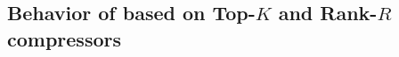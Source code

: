 \documentclass[11pt]{article}
\begin{document}
	
	\subsection{Behavior of  based on Top-$K$ and Rank-$R$ compressors}
	
\end{document}
